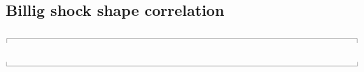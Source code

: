 \documentclass[12pt,a4paper,twoside]{article}
\newcommand{\topbar}{\ensuremath{
    \rule{0.1mm}{2.0mm} \rule[2.0mm]{159.5mm}{0.1mm} \rule{0.1mm}{2.0mm}
}}
\newcommand{\bottombar}{\ensuremath{
    \rule{0.1mm}{2.0mm} \rule{159.5mm}{0.1mm} \rule{0.1mm}{2.0mm}
}}
\begin{document}
\subsection{Billig shock shape correlation}
\label{billig-correlation}
\topbar

\bottombar

\cleardoublepage


\cleardoublepage


\cleardoublepage


\cleardoublepage


\cleardoublepage


\cleardoublepage


\cleardoublepage


\cleardoublepage
{} %
\printindex
\end{document}
